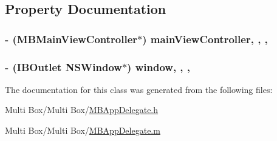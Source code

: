 \subsection{Property Documentation}
\hypertarget{interface_m_b_app_delegate_aa78c8d20f13f426f8cd14cd9233965c1}{
\subsubsection[{main\-View\-Controller}]{\setlength{\rightskip}{0pt plus 5cm}-\/ ({\bf M\-B\-Main\-View\-Controller}$\ast$) main\-View\-Controller\hspace{0.3cm}{\ttfamily [read]}, {\ttfamily [write]}, {\ttfamily [nonatomic]}, {\ttfamily [strong]}}}\label{interface_m_b_app_delegate_aa78c8d20f13f426f8cd14cd9233965c1}
\hypertarget{interface_m_b_app_delegate_adfe23c721bf6a723e13a5076b9ca08b2}{
\subsubsection[{window}]{\setlength{\rightskip}{0pt plus 5cm}-\/ (I\-B\-Outlet N\-S\-Window$\ast$) window\hspace{0.3cm}{\ttfamily [read]}, {\ttfamily [write]}, {\ttfamily [atomic]}, {\ttfamily [assign]}}}\label{interface_m_b_app_delegate_adfe23c721bf6a723e13a5076b9ca08b2}


The documentation for this class was generated from the following files\-:\begin{DoxyCompactItemize}
\item 
Multi Box/\-Multi Box/\hyperlink{_m_b_app_delegate_8h}{M\-B\-App\-Delegate.\-h}\item 
Multi Box/\-Multi Box/\hyperlink{_m_b_app_delegate_8m}{M\-B\-App\-Delegate.\-m}\end{DoxyCompactItemize}
